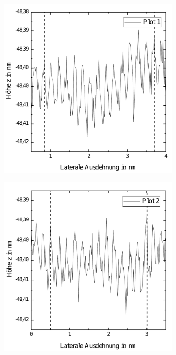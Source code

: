 \documentclass[a4paper,twoside,final]{article}
\begin{document}
\begin{figure}[htp]
    \centering
    \begin{subfigure}{0.3\textwidth}
        \includegraphics[width=\textwidth]{Bilder/Graphen_Profil1.pdf}
        \caption{ }
    \end{subfigure}
    \hspace{0.5cm}
    \begin{subfigure}{0.3\textwidth}
        \includegraphics[width=\textwidth]{Bilder/Graphen_Profil2.pdf}

\end{subfigure}
\end{figure}
\end{document}
